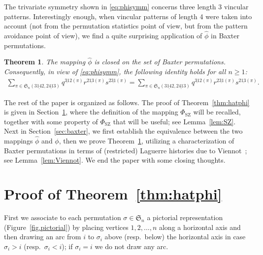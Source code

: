 \documentclass[12pt,reqno]{amsart}
\numberwithin{equation}{section}
\theoremstyle{plain}
\newtheorem{theorem}{Theorem}[section]
\theoremstyle{definition}
\def\Sym{\mathfrak{S}}
\def\SZ{\mathrm{SZ}}
\def\rasc{\mathrm{2\underline{13}}}
\def\rdes{\mathrm{2\underline{31}}}
\def\ldes{\mathrm{\underline{31}2}}
\def\baxter{\mathrm{3\underline{14}2,2\underline{41}3}}
\begin{document}
The trivariate symmetry shown in \eqref{eq:phisymm} concerns three length 3 vincular patterns. Interestingly enough, when vincular patterns of length 4 were taken into account (not from the permutation statistics point of view, but from the pattern avoidance point of view), we find a quite surprising application of $\widehat{\phi}$ in Baxter permutations. 


\begin{theorem}\label{thm:baxter}
The mapping $\widehat\phi$ is closed on the set of Baxter permutations.
Consequently, in view of \eqref{eq:phisymm}, the following identity holds for all $n\ge 1$:
\begin{align}\label{eq:baxter equidist}
\sum_{\pi \in \Sym_n(\baxter)} q^{\ldes(\pi)}r^{\rasc(\pi)}s^{\rdes(\pi)}=
\sum_{\pi \in \Sym_n(\baxter)} q^{\ldes(\pi)}r^{\rdes(\pi)}s^{\rasc(\pi)}.
\end{align}
\end{theorem}

The rest of the paper is organized as follows. The proof of Theorem~\ref{thm:hatphi} is given in Section~\ref{sec:pf of Thm1.3}, where the definition of the mapping $\Phi_{\SZ}$ will be recalled, together with some property of $\Phi_{\SZ}$ that will be useful; see Lemma~\ref{lem:SZ}. Next in Section~\ref{sec:baxter}, we first establish the equivalence between the two mappings $\widehat\phi$ and $\phi$, then we prove Theorem~\ref{thm:baxter}, utilizing a characterization of Baxter permutations in terms of (restricted) Laguerre histories due to Viennot~\cite{Vi81}; see Lemma~\ref{lem:Viennot}. We end the paper with some closing thoughts.



















\section{Proof of Theorem~\ref{thm:hatphi}}\label{sec:pf of Thm1.3}
First we associate to each permutation $\sigma \in \Sym_n$
a pictorial representation (Figure~\ref{fig.pictorial})
by placing vertices $1,2,\ldots,n$ along a horizontal axis
and then drawing an arc from $i$ to $\sigma_i$
above (resp.\ below) the horizontal axis
in case $\sigma_i > i$ (resp.\ $\sigma_i < i$);
if $\sigma_i = i$ we do not draw any arc.
\end{document}
